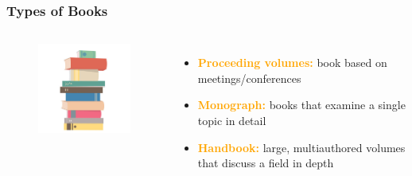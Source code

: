 \documentclass[newPxFont,sthlmFooter]{beamer}
\newcommand{\fs}{\footnotesize}
\begin{document}
\begin{frame}\frametitle{Types of Books}

    \begin{columns}[T,onlytextwidth]
    \begin{figure}
      \centering
      \includegraphics[width=2in]{figs/book} 
    \end{figure}
        \vspace{1cm}
    \begin{itemize}
    \fs
      \item \textcolor{orange}{\bf Proceeding volumes:} book based on meetings/conferences
      \item \textcolor{orange}{\bf Monograph:} books that examine a single topic in detail
      \item \textcolor{orange}{\bf Handbook:} large, multiauthored volumes that discuss a field in depth
    \end{itemize}
    \vspace{-2cm}
    \end{columns}
  \end{frame}
  
\end{document}
